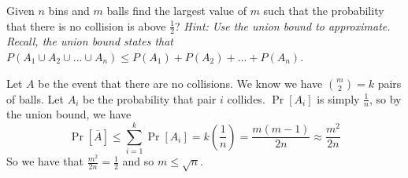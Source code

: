 \question 
Given $n$ bins and $m$ balls find the largest value of $m$ such that the probability that there is no collision is above $\frac{1}{2}$? \textit{Hint: Use the union bound to approximate. Recall, the union bound states that $P(A_1 \cup A_2 \cup ... \cup A_n) \leq P(A_1) + P(A_2) + ... + P(A_n)$}.
    \begin{solution}[1.5 in] Let $A$ be the event that there are no collisions. We know we have $\binom{m}{2} = k$ pairs of balls. Let $A_i$ be the probability that pair $i$ collides. $\Pr[A_i]$ is simply $\frac{1}{n}$, so by the union bound, we have 
    \[\Pr[\overline{A}] \leq \sum_{i=1}^{k} \Pr[A_i] = k \left(\frac{1}{n}\right) = \frac{m(m-1)}{2n}\approx \frac{m^2}{2n}\]
    So we have that $\frac{m^2}{2n} = \frac{1}{2}$ and so $m \leq \sqrt{n}$. 
\end{solution} 